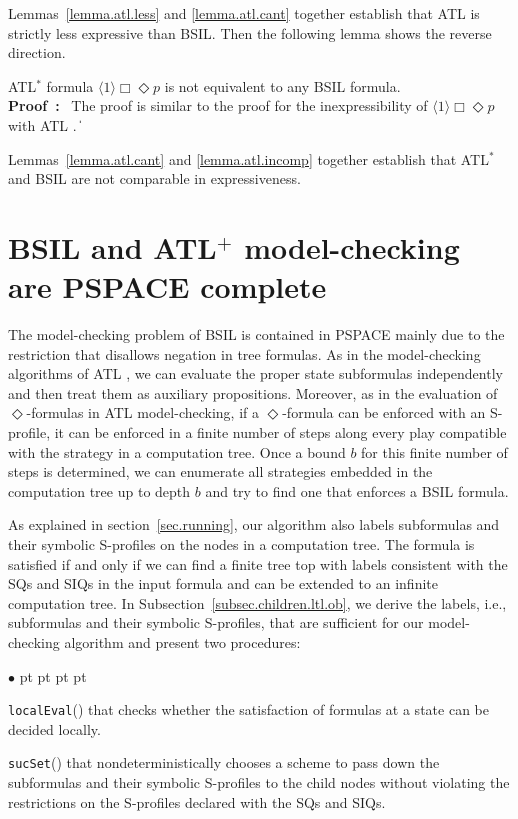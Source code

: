 \documentclass[11pt]{article}
\newcommand{\ttsynsuc}{\mbox{\tt sucSet}}
\newcommand{\tteval}{\mbox{\tt localEval}}
\newcommand{\pf}{\noindent\mbox{\bf Proof : }}
\newcommand{\pfrr}{\Box}
\newcommand{\pevt}{\Diamond}
\def\qed{\ifmmode\|\else{\unskip\nobreak\hfil
\penalty50\hskip1em\null\nobreak\hfil$\blacksquare$
\parfillskip=0pt\finalhyphendemerits=0\endgraf}\fi}
\newenvironment{list1}{\begin{list}{$\bullet$}
{\topsep 0 pt \parsep 0 pt \partopsep 0 pt \itemsep 0 pt}}{\end{list}}
\begin{document}
Lemmas~\ref{lemma.atl.less} and \ref{lemma.atl.cant} together establish  
that ATL is strictly less expressive than BSIL. 
Then the following lemma shows the reverse direction.  

{\lemma \label{lemma.atl.incomp}
ATL$^*$ formula $\langle 1\rangle\pfrr\pevt p$
is not equivalent to any BSIL formula.
} 
\\\pf 
The proof is similar to the proof for the inexpressibility of 
$\langle 1\rangle\pfrr\pevt p$ with ATL \cite{AHK02}.  
\qed 

Lemmas~\ref{lemma.atl.cant} and \ref{lemma.atl.incomp}
together establish  
that ATL$^*$ and BSIL are not comparable in expressiveness. 








\section{BSIL and ATL$^+$ model-checking are PSPACE complete 
\label{sec.mck.psp}}





The model-checking problem of BSIL is contained in 
PSPACE mainly due to the restriction that disallows 
negation in tree formulas.
As in the model-checking algorithms 
of ATL \cite{AHK02}, we can evaluate the proper state subformulas \label{reply1.subformulas.formulas} 
independently and then treat them as auxiliary propositions.  
Moreover, as in the evaluation of $\pevt$-formulas in 
ATL model-checking, 
if a $\pevt$-formula can be enforced with an S-profile, it can be enforced 
in a finite number of steps along every play compatible with 
the strategy in a computation tree.  
Once a bound $b$ for this finite number of steps is determined, 
we can enumerate all strategies embedded in the computation 
tree up to depth $b$ and try to find one that enforces a BSIL formula.  

\label{reply2.exp.alg2} 
As explained in section~\ref{sec.running}, 
our algorithm also labels subformulas and their symbolic S-profiles 
on the nodes in a computation tree. 
The formula is satisfied if and only if we can 
find a finite tree top with labels consistent with the SQs and SIQs in the input formula 
and can be extended to an infinite computation tree. 
In Subsection~\ref{subsec.children.ltl.ob},
we derive the labels, i.e., subformulas and their symbolic S-profiles, that are 
sufficient for our model-checking algorithm and 
present two procedures: 
\begin{list1} 
\item \tteval() that checks whether the satisfaction of formulas at a state 
	can be decided locally.  
\item \ttsynsuc() that nondeterministically chooses a scheme to 
	pass down the subformulas and their symbolic S-profiles to the child nodes 
	without violating the restrictions on the S-profiles declared with the SQs and SIQs. 
\end{list1} 
\end{document}
